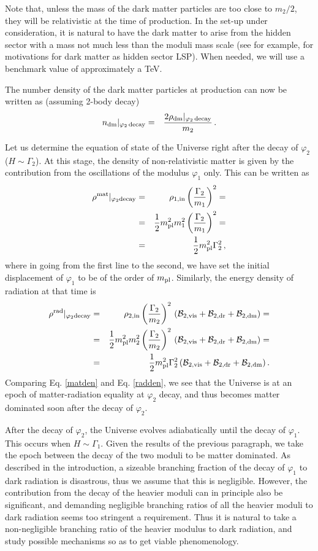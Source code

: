 \documentclass[12pt]{article}
\numberwithin{equation}{section}
\def\bea{\begin{eqnarray}}
\def\eea{\end{eqnarray}}
\begin{document}
Note that, unless the mass of the dark matter particles are too close to $m_2/2$, they will be relativistic at the time of production.
In the set-up under consideration, it is natural to have the dark matter to arise from the hidden sector with a mass not much less than the
moduli mass scale (see for example, \cite{bob,bob1} for motivations for dark matter as hidden sector LSP). When needed, we will use a benchmark value
of approximately a TeV. 



The number density of the dark matter particles at production can now be written as (assuming 2-body decay)
\bea
\label{dm22}
n_{\rm dm}|_ {\varphi_2 \, {\rm decay}} &=& \frac{2 \rho_{\rm dm}|_ {\varphi_2 \, {\rm decay}}}{m_2} \,.
\eea



Let us determine the equation of state of the Universe right after the decay of $\varphi_2$ ($H \sim \Gamma_2$).
At this stage,  the density of non-relativistic matter is  given by the contribution from the oscillations of the modulus $\varphi_1$ only.
This can be written as
%
\bea
\rho^{\rm mat}|_{\varphi_2 \rm{decay}}   &=& \rho_{\rm \textrm 1,  in} \left( \frac{\Gamma_2}{m_1} \right)^2 = \cr
&=& \frac{1}{2}m_{\rm pl}^2 m_1^2 \left( \frac{\Gamma_2}{m_1} \right)^2 = \cr
&=& \frac{1}{2}m_{\rm pl}^2 \Gamma_2^2  \,,
\label{matden}
\eea
%
where in going from the first line to the second, we have set the initial displacement of $\varphi_1$ to be of the order of $m_{\rm pl}$.
Similarly, the energy density of radiation at that time is 
%
\bea
\rho^{\rm rad}|_{\rm{ \varphi_2 decay}} &=& \rho_{\rm 2, in } \left( \frac{\Gamma_2}{m_2} \right)^2 \,
({\cal B}_{\rm 2,vis} + {\cal B}_{\rm 2,dr} + {\cal B}_{\rm 2,dm}) = \cr
&=& \frac{1}{2}m_{\rm pl}^2 m_2^2 \left( \frac{\Gamma_2}{m_2} \right)^2 \,
({\cal B}_{\rm 2,vis} + {\cal B}_{\rm 2,dr} + {\cal B}_{\rm 2,dm}) = \cr
&=&    \frac{1}{2}m_{\rm pl}^2  \Gamma_2^2 \, ({\cal B}_{\rm 2,vis} + {\cal B}_{\rm 2,dr} + {\cal B}_{\rm 2,dm}) \,.
\label{radden} 
\eea
%
Comparing Eq. \eqref{matden} and Eq. \eqref{radden}, we see that  the Universe is at an epoch of matter-radiation equality
at $\varphi_2$ decay, and thus becomes matter dominated soon after the decay of $\varphi_2$. 


After the decay of $\varphi_2$, the Universe evolves adiabatically until the decay of $\varphi_1$. This occurs when $H \sim \Gamma_1$.
Given the results of the previous paragraph, we take the epoch between the decay of the two moduli to be matter dominated.
As described in the introduction, a sizeable branching fraction of the decay of $\varphi_1$ to dark radiation is disastrous, thus we
assume that this is negligible. However, the contribution from the decay of the heavier moduli can in principle also be significant, and demanding negligible
branching ratios of all the heavier moduli to dark radiation seems too stringent a requirement. Thus it is natural to take a non-negligible branching ratio
of the heavier modulus to dark radiation, and study possible mechanisms 
so as to get viable phenomenology.
\end{document}

